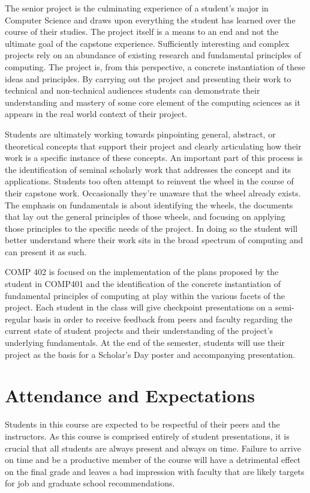 \documentclass[10pt]{article}
\begin{document}
The senior project is the culminating experience of a student's major in Computer Science and draws upon everything the student has learned over the course of their studies. The project itself is a means to an end and not the ultimate goal of the capstone experience. Sufficiently interesting and complex projects rely on an abundance of existing research and fundamental principles of computing.  The project is, from this perspective, a concrete instantiation of these ideas and principles. By carrying out the project and presenting their work to technical and non-technical audiences students can demonstrate their understanding and mastery of some core element of the computing sciences as it appears in the real world context of their project. 

Students are ultimately working towards pinpointing general, abstract, or theoretical concepts that support their project and clearly articulating how their work is a specific instance of these concepts. An important part of this process is the identification of seminal scholarly work that addresses the concept and its applications. Students too often attempt to reinvent the wheel in the course of their capstone work. Occasionally they're unaware that the wheel already exists. The emphasis on fundamentals is about identifying the wheels, the documents that lay out the general principles of those wheels, and focusing on applying those principles to the specific needs of the project. In doing so the student will better understand where their work sits in the broad spectrum of computing and can present it as such. 

COMP 402 is focused on the implementation of the plans proposed by the student in COMP401 and the identification of the concrete instantiation of fundamental principles of computing at play within the various facets of the project. Each student in the class will give checkpoint presentations on a semi-regular basis in order to receive feedback from peers and faculty regarding the current state of student projects and their understanding of the project's underlying fundamentals.   At the end of the semester, students will use their project as the basis for a Scholar's Day poster and accompanying presentation.



\section{Attendance and Expectations}

Students in this course are expected to be respectful of their peers and the instructors. As this course is comprised entirely of student presentations, it is crucial that all students are always present and always on time.  Failure to arrive on time and be a productive member of the course will have a detrimental effect on the final grade and leaves a bad impression with faculty that are likely targets for job and graduate school recommendations.
\end{document}
